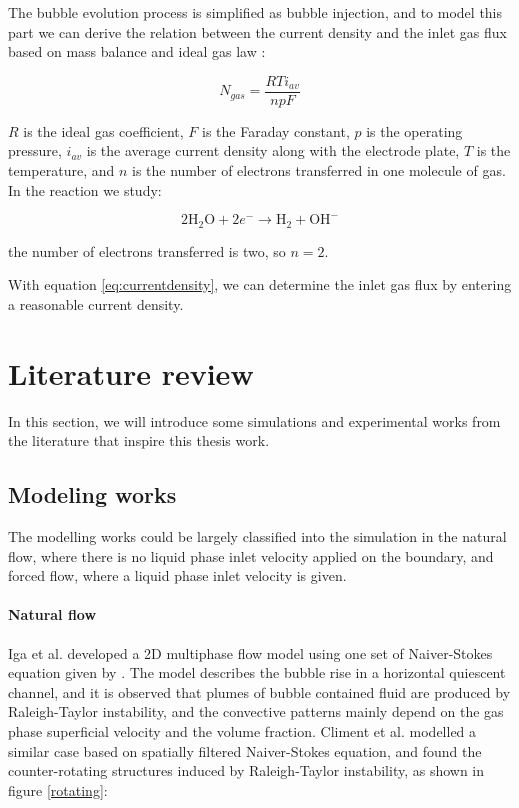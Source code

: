 The bubble evolution process is simplified as bubble injection, and to model this part we can derive the relation between the current density and the inlet gas flux based on mass balance and ideal gas law \cite{Energy}:

\begin{equation}\label{eq:gasevolution}
    N_{gas} = \frac{RTi_{av}}{npF}
\end{equation}

$R$ is the ideal gas coefficient, $F$ is the Faraday constant, $p$ is the operating pressure, $i_{av}$ is the average current density along with the electrode plate, $T$ is the temperature, and $n$ is the number of electrons transferred in one molecule of gas. In the reaction we study:

\begin{equation}\label{eq:currentdensity}
2\mathrm{H_2O} + 2e^- \longrightarrow \mathrm{H_2} + \mathrm{OH^-}
\end{equation}

the number of electrons transferred is two, so $n = 2$.

With equation \ref{eq:currentdensity}, we can determine the inlet gas flux by entering a reasonable current density.


\section{Literature review}

In this section, we will introduce some simulations and experimental works from the literature that inspire this thesis work.

\subsection{Modeling works}\label{modellingreview}

The modelling works could be largely classified into the simulation in the natural flow, where there is no liquid phase inlet velocity applied on the boundary, and forced flow, where a liquid phase inlet velocity is given. 

\paragraph{Natural flow}
\*

Iga et al. \cite{K.IGAand} developed a 2D multiphase flow model using one set of Naiver-Stokes equation given by \cite{matsumoto1991numerical}. The model describes the bubble rise in a horizontal quiescent channel, and it is observed that plumes of bubble contained fluid are produced by Raleigh-Taylor instability, and the convective patterns mainly depend on the gas phase superficial velocity and the volume fraction. Climent et al. \cite{Climent1999} modelled a similar case based on spatially filtered Naiver-Stokes equation, and found the counter-rotating structures induced by Raleigh-Taylor instability, as shown in figure \ref{rotating}:

